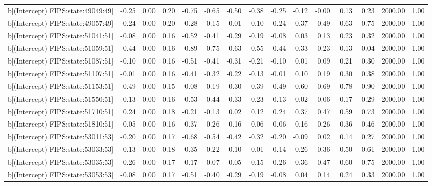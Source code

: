 \begin{table}[ht]
\begin{tabular}{rrrrrrrrrrrrrrr}
  b[(Intercept) FIPS:state:49049:49] & -0.25 & 0.00 & 0.20 & -0.75 & -0.65 & -0.50 & -0.38 & -0.25 & -0.12 & -0.00 & 0.13 & 0.23 & 2000.00 & 1.00 \\ 
  b[(Intercept) FIPS:state:49057:49] & 0.24 & 0.00 & 0.20 & -0.28 & -0.15 & -0.01 & 0.10 & 0.24 & 0.37 & 0.49 & 0.63 & 0.75 & 2000.00 & 1.00 \\ 
  b[(Intercept) FIPS:state:51041:51] & -0.08 & 0.00 & 0.16 & -0.52 & -0.41 & -0.29 & -0.19 & -0.08 & 0.03 & 0.13 & 0.23 & 0.32 & 2000.00 & 1.00 \\ 
  b[(Intercept) FIPS:state:51059:51] & -0.44 & 0.00 & 0.16 & -0.89 & -0.75 & -0.63 & -0.55 & -0.44 & -0.33 & -0.23 & -0.13 & -0.04 & 2000.00 & 1.00 \\ 
  b[(Intercept) FIPS:state:51087:51] & -0.10 & 0.00 & 0.16 & -0.51 & -0.41 & -0.31 & -0.21 & -0.10 & 0.01 & 0.09 & 0.21 & 0.30 & 2000.00 & 1.00 \\ 
  b[(Intercept) FIPS:state:51107:51] & -0.01 & 0.00 & 0.16 & -0.41 & -0.32 & -0.22 & -0.13 & -0.01 & 0.10 & 0.19 & 0.30 & 0.38 & 2000.00 & 1.00 \\ 
  b[(Intercept) FIPS:state:51153:51] & 0.49 & 0.00 & 0.15 & 0.08 & 0.19 & 0.30 & 0.39 & 0.49 & 0.60 & 0.69 & 0.78 & 0.90 & 2000.00 & 1.00 \\ 
  b[(Intercept) FIPS:state:51550:51] & -0.13 & 0.00 & 0.16 & -0.53 & -0.44 & -0.33 & -0.23 & -0.13 & -0.02 & 0.06 & 0.17 & 0.29 & 2000.00 & 1.00 \\ 
  b[(Intercept) FIPS:state:51710:51] & 0.24 & 0.00 & 0.18 & -0.21 & -0.13 & 0.02 & 0.12 & 0.24 & 0.37 & 0.47 & 0.59 & 0.73 & 2000.00 & 1.00 \\ 
  b[(Intercept) FIPS:state:51810:51] & 0.05 & 0.00 & 0.16 & -0.37 & -0.26 & -0.16 & -0.06 & 0.06 & 0.16 & 0.26 & 0.36 & 0.46 & 2000.00 & 1.00 \\ 
  b[(Intercept) FIPS:state:53011:53] & -0.20 & 0.00 & 0.17 & -0.68 & -0.54 & -0.42 & -0.32 & -0.20 & -0.09 & 0.02 & 0.14 & 0.27 & 2000.00 & 1.00 \\ 
  b[(Intercept) FIPS:state:53033:53] & 0.13 & 0.00 & 0.18 & -0.35 & -0.22 & -0.10 & 0.01 & 0.14 & 0.26 & 0.36 & 0.50 & 0.61 & 2000.00 & 1.00 \\ 
  b[(Intercept) FIPS:state:53035:53] & 0.26 & 0.00 & 0.17 & -0.17 & -0.07 & 0.05 & 0.15 & 0.26 & 0.36 & 0.47 & 0.60 & 0.75 & 2000.00 & 1.00 \\ 
  b[(Intercept) FIPS:state:53053:53] & -0.08 & 0.00 & 0.17 & -0.51 & -0.40 & -0.29 & -0.19 & -0.08 & 0.04 & 0.14 & 0.24 & 0.33 & 2000.00 & 1.00 \\ 

\end{tabular}
\end{table}
